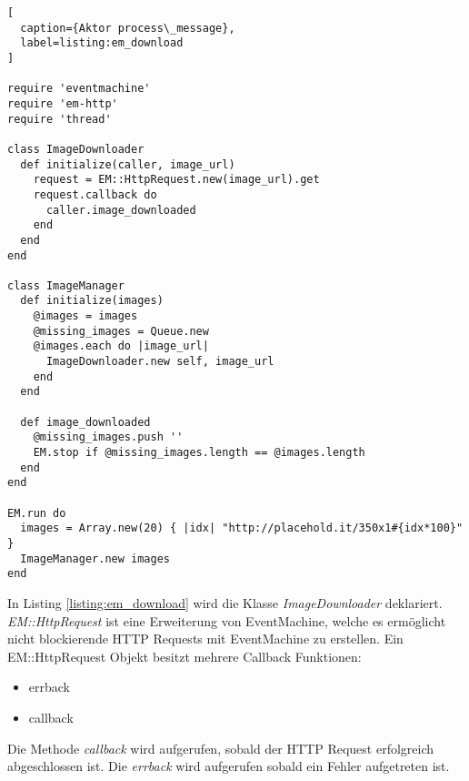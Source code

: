 \begin{lstlisting}[
  caption={Aktor process\_message},
  label=listing:em_download
]

require 'eventmachine'
require 'em-http'
require 'thread'

class ImageDownloader
  def initialize(caller, image_url)
    request = EM::HttpRequest.new(image_url).get
    request.callback do
      caller.image_downloaded
    end
  end
end

class ImageManager
  def initialize(images)
    @images = images
    @missing_images = Queue.new
    @images.each do |image_url|
      ImageDownloader.new self, image_url
    end
  end

  def image_downloaded
    @missing_images.push ''
    EM.stop if @missing_images.length == @images.length
  end
end

EM.run do
  images = Array.new(20) { |idx| "http://placehold.it/350x1#{idx*100}" }
  ImageManager.new images
end
\end{lstlisting}

In Listing \ref{listing:em_download} wird die Klasse \emph{ImageDownloader} deklariert. \emph{EM::HttpRequest} ist eine Erweiterung von EventMachine, welche es ermöglicht nicht blockierende HTTP Requests mit EventMachine zu erstellen. Ein EM::HttpRequest Objekt besitzt mehrere Callback Funktionen:

\begin{itemize}
  \item errback
  \item callback
\end{itemize}

Die Methode \emph{callback} wird aufgerufen, sobald der HTTP Request erfolgreich abgeschlossen ist. Die \emph{errback} wird aufgerufen sobald ein Fehler aufgetreten ist.

